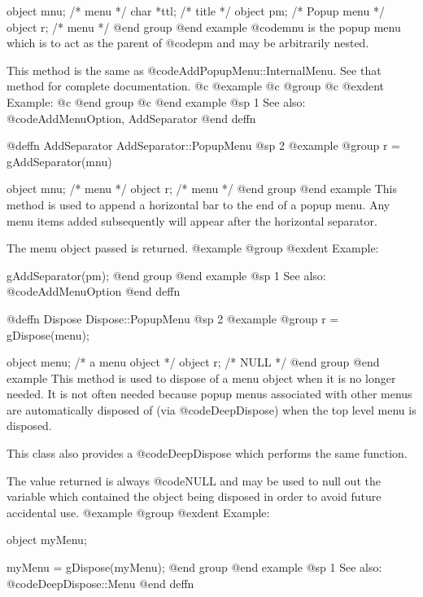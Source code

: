 object  mnu;    /*  menu        */
char    *ttl;   /*  title       */
object  pm;     /*  Popup menu  */
object  r;      /*  menu        */
@end group
@end example
@code{mnu} is the popup menu which is to act as the parent of @code{pm}
and may be arbitrarily nested.

This method is the same as @code{AddPopupMenu::InternalMenu}.  See that
method for complete documentation.
@c @example
@c @group
@c @exdent Example:
@c @end group
@c @end example
@sp 1
See also:  @code{AddMenuOption, AddSeparator}
@end deffn










@deffn {AddSeparator} AddSeparator::PopupMenu
@sp 2
@example
@group
r = gAddSeparator(mnu)

object  mnu;    /*  menu        */
object  r;      /*  menu        */
@end group
@end example
This method is used to append a horizontal bar to the end of a popup
menu.  Any menu items added subsequently will appear after the
horizontal separator.

The menu object passed is returned.
@example
@group
@exdent Example:

gAddSeparator(pm);
@end group
@end example
@sp 1
See also:  @code{AddMenuOption}
@end deffn











@deffn {Dispose} Dispose::PopupMenu
@sp 2
@example
@group
r = gDispose(menu);

object  menu;   /*  a menu object   */
object  r;      /*  NULL            */
@end group
@end example
This method is used to dispose of a menu object when it is no longer
needed.  It is not often needed because popup menus associated with
other menus are automatically disposed of (via @code{DeepDispose}) when
the top level menu is disposed.

This class also provides a @code{DeepDispose} which performs the same
function.

The value returned is always @code{NULL} and may be used to null out
the variable which contained the object being disposed in order to
avoid future accidental use.
@example
@group
@exdent Example:

object  myMenu;

myMenu = gDispose(myMenu);
@end group
@end example
@sp 1
See also:  @code{DeepDispose::Menu}
@end deffn








